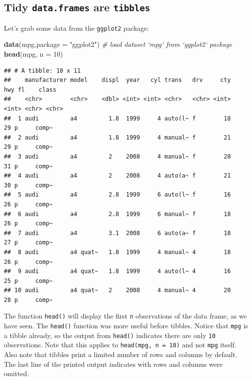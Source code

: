\documentclass[]{book}
\newenvironment{Shaded}{\begin{snugshade}}{\end{snugshade}}
\newcommand{\KeywordTok}[1]{\textcolor[rgb]{0.13,0.29,0.53}{\textbf{#1}}}
\newcommand{\DataTypeTok}[1]{\textcolor[rgb]{0.13,0.29,0.53}{#1}}
\newcommand{\DecValTok}[1]{\textcolor[rgb]{0.00,0.00,0.81}{#1}}
\newcommand{\StringTok}[1]{\textcolor[rgb]{0.31,0.60,0.02}{#1}}
\newcommand{\CommentTok}[1]{\textcolor[rgb]{0.56,0.35,0.01}{\textit{#1}}}
\newcommand{\NormalTok}[1]{#1}
\begin{document}
\subsection{\texorpdfstring{Tidy \texttt{data.frames} are
\texttt{tibbles}}{Tidy data.frames are tibbles}}\label{tidy-data.frames-are-tibbles}

Let's grab some data from the \texttt{ggplot2} package:

\begin{Shaded}
\begin{Highlighting}[]
\KeywordTok{data}\NormalTok{(mpg,}\DataTypeTok{package =} \StringTok{"ggplot2"}\NormalTok{)  }\CommentTok{# load dataset `mpg` from `ggplot2` package}
\KeywordTok{head}\NormalTok{(mpg, }\DataTypeTok{n =} \DecValTok{10}\NormalTok{)}
\end{Highlighting}
\end{Shaded}

\begin{verbatim}
## # A tibble: 10 x 11
##    manufacturer model    displ  year   cyl trans   drv     cty   hwy fl    class
##    <chr>        <chr>    <dbl> <int> <int> <chr>   <chr> <int> <int> <chr> <chr>
##  1 audi         a4         1.8  1999     4 auto(l~ f        18    29 p     comp~
##  2 audi         a4         1.8  1999     4 manual~ f        21    29 p     comp~
##  3 audi         a4         2    2008     4 manual~ f        20    31 p     comp~
##  4 audi         a4         2    2008     4 auto(a~ f        21    30 p     comp~
##  5 audi         a4         2.8  1999     6 auto(l~ f        16    26 p     comp~
##  6 audi         a4         2.8  1999     6 manual~ f        18    26 p     comp~
##  7 audi         a4         3.1  2008     6 auto(a~ f        18    27 p     comp~
##  8 audi         a4 quat~   1.8  1999     4 manual~ 4        18    26 p     comp~
##  9 audi         a4 quat~   1.8  1999     4 auto(l~ 4        16    25 p     comp~
## 10 audi         a4 quat~   2    2008     4 manual~ 4        20    28 p     comp~
\end{verbatim}

The function \texttt{head()} will display the first \texttt{n}
observations of the data frame, as we have seen. The \texttt{head()}
function was more useful before tibbles. Notice that \texttt{mpg} is a
tibble already, so the output from \texttt{head()} indicates there are
only \texttt{10} observations. Note that this applies to
\texttt{head(mpg,\ n\ =\ 10)} and not \texttt{mpg} itself. Also note
that tibbles print a limited number of rows and columns by default. The
last line of the printed output indicates with rows and columns were
omitted.
\end{document}
